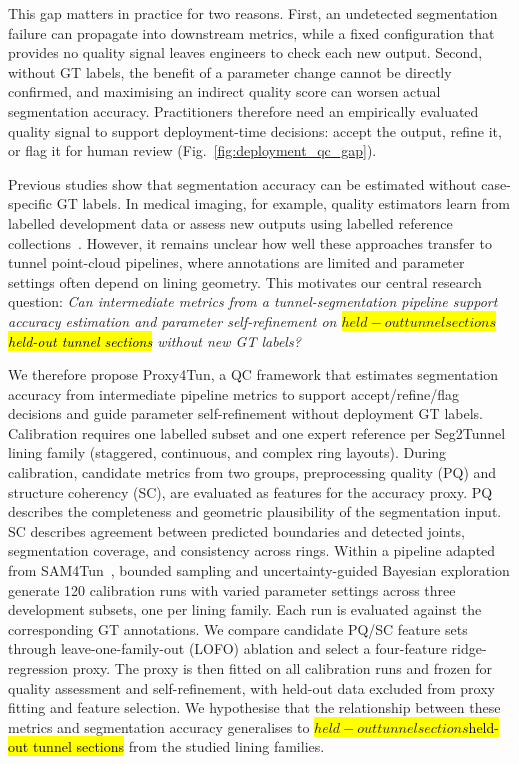 \documentclass[a4paper,fleqn]{cas-dc}
\let\texthl\hl
\renewcommand{\hl}[1]{\ifmmode\colorbox{yellow}{\ensuremath{#1}}\else\texthl{#1}\fi}
\begin{document}
This gap matters in practice for two reasons. First, an undetected segmentation failure can propagate into downstream metrics, while a fixed configuration that provides no quality signal leaves engineers to check each new output. Second, without GT labels, the benefit of a parameter change cannot be directly confirmed, and maximising an indirect quality score can worsen actual segmentation accuracy. Practitioners therefore need an empirically evaluated quality signal to support deployment-time decisions: accept the output, refine it, or flag it for human review (Fig.~\ref{fig:deployment_qc_gap}).

Previous studies show that segmentation accuracy can be estimated without case-specific GT labels. In medical imaging, for example, quality estimators learn from labelled development data or assess new outputs using labelled reference collections~\cite{valindria2017rca,robinson2018segmentationQuality,fournel2021segmentationQC}. However, it remains unclear how well these approaches transfer to tunnel point-cloud pipelines, where annotations are limited and parameter settings often depend on lining geometry. This motivates our central research question: \emph{Can intermediate metrics from a tunnel-segmentation pipeline support accuracy estimation and parameter self-refinement on \hl{held-out tunnel sections} without new GT labels?}

We therefore propose Proxy4Tun, a QC framework that estimates segmentation accuracy from intermediate pipeline metrics to support accept/refine/flag decisions and guide parameter self-refinement without deployment GT labels. Calibration requires one labelled subset and one expert reference per Seg2Tunnel lining family (staggered, continuous, and complex ring layouts). During calibration, candidate metrics from two groups, preprocessing quality (PQ) and structure coherency (SC), are evaluated as features for the accuracy proxy. PQ describes the completeness and geometric plausibility of the segmentation input. SC describes agreement between predicted boundaries and detected joints, segmentation coverage, and consistency across rings. Within a pipeline adapted from SAM4Tun~\cite{ye2025sam4tun}, bounded sampling and uncertainty-guided Bayesian exploration generate 120 calibration runs with varied parameter settings across three development subsets, one per lining family. Each run is evaluated against the corresponding GT annotations. We compare candidate PQ/SC feature sets through leave-one-family-out (LOFO) ablation and select a four-feature ridge-regression proxy. The proxy is then fitted on all calibration runs and frozen for quality assessment and self-refinement, with held-out data excluded from proxy fitting and feature selection. We hypothesise that the relationship between these metrics and segmentation accuracy generalises to \hl{held-out tunnel sections} from the studied lining families.
\end{document}
